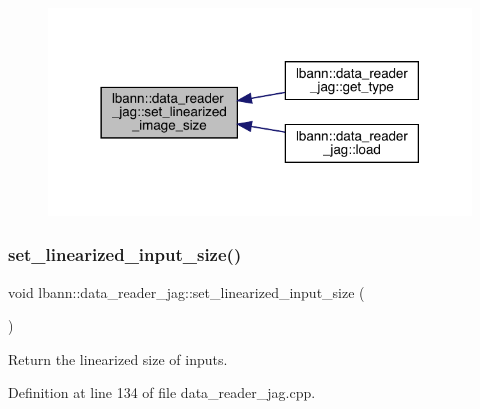 \begin{figure}[H]
\begin{center}
\leavevmode
\includegraphics[width=318pt]{classlbann_1_1data__reader__jag_af1e7add9e8bdcf97fe81bfc27b618387_icgraph}
\end{center}
\end{figure}
\mbox{\label{classlbann_1_1data__reader__jag_a15f9aab2180ff66b7b5ace00957740df}} 
\subsubsection{\texorpdfstring{set\+\_\+linearized\+\_\+input\+\_\+size()}{set\_linearized\_input\_size()}}
{\footnotesize\ttfamily void lbann\+::data\+\_\+reader\+\_\+jag\+::set\+\_\+linearized\+\_\+input\+\_\+size (\begin{DoxyParamCaption}{ }\end{DoxyParamCaption})\hspace{0.3cm}{\ttfamily [protected]}}



Return the linearized size of inputs. 



Definition at line 134 of file data\+\_\+reader\+\_\+jag.\+cpp.


